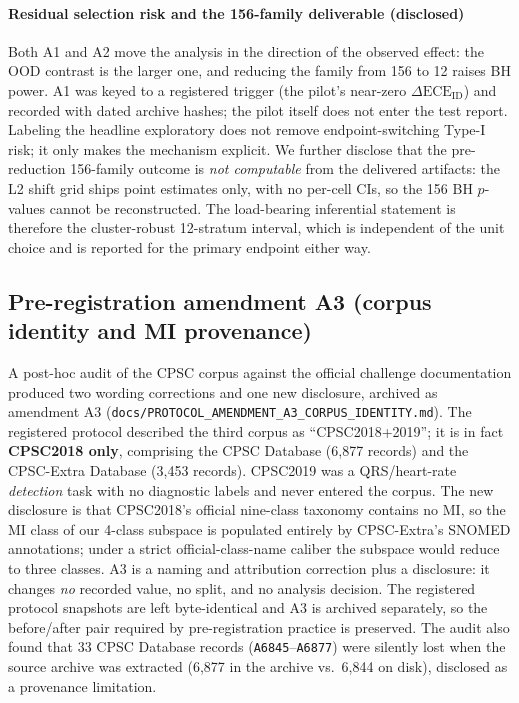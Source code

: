 \documentclass[review,12pt,nonatbib]{elsarticle}
\begin{document}
\paragraph{Residual selection risk and the 156-family deliverable
(disclosed)} Both A1 and A2 move the analysis in the direction of the
observed effect: the OOD contrast is the larger one, and reducing the
family from 156 to 12 raises BH power. A1 was keyed to a registered
trigger (the pilot's near-zero $\Delta\text{ECE}_{\text{ID}}$) and
recorded with dated archive hashes; the pilot itself does not enter the
test report. Labeling the headline exploratory does not remove
endpoint-switching Type-I risk; it only makes the mechanism explicit.
We further disclose that the pre-reduction 156-family outcome is
\emph{not computable} from the delivered artifacts: the L2 shift grid
ships point estimates only, with no per-cell CIs, so the 156 BH
$p$-values cannot be reconstructed. The load-bearing inferential
statement is therefore the cluster-robust 12-stratum interval, which is
independent of the unit choice and is reported for the primary endpoint
either way.

\subsection{Pre-registration amendment A3 (corpus identity and MI provenance)}
\label{sec:a3}
A post-hoc audit of the CPSC corpus against the official challenge
documentation produced two wording corrections and one new disclosure,
archived as amendment A3
(\texttt{docs/PROTOCOL\_AMENDMENT\_A3\_}\allowbreak\texttt{CORPUS\_IDENTITY.md}).
The registered protocol described the third corpus as
``CPSC2018+2019''; it is in fact \textbf{CPSC2018 only}, comprising the
CPSC Database (6,877 records) and the CPSC-Extra Database (3,453
records). CPSC2019 was a QRS/heart-rate \emph{detection} task with no
diagnostic labels and never entered the corpus. The new disclosure is
that CPSC2018's official nine-class taxonomy contains no MI, so the MI
class of our 4-class subspace is populated entirely by CPSC-Extra's
SNOMED annotations; under a strict official-class-name caliber the
subspace would reduce to three classes. A3 is a naming and attribution
correction plus a disclosure: it changes \emph{no} recorded value, no
split, and no analysis decision. The registered protocol snapshots are
left byte-identical and A3 is archived separately, so the
before/after pair required by pre-registration practice is preserved.
The audit also found that 33 CPSC Database records
(\texttt{A6845}--\texttt{A6877}) were silently lost when the source
archive was extracted (6,877 in the archive vs.\ 6,844 on disk),
disclosed as a provenance limitation.
\end{document}
